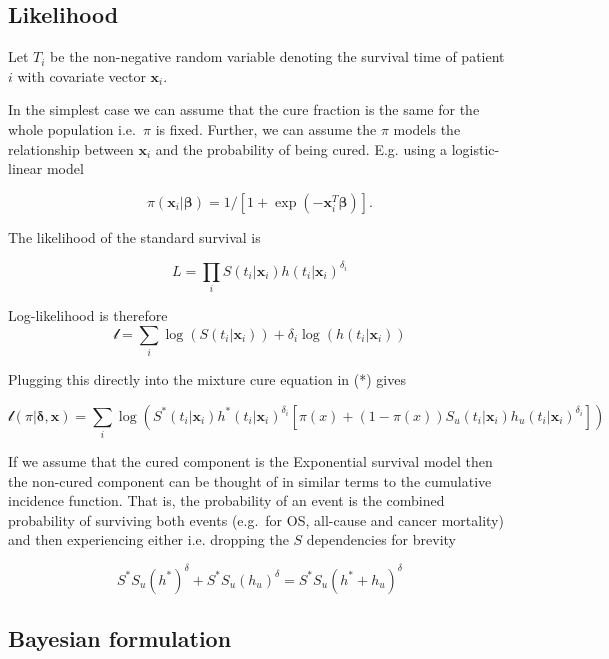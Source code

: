 \documentclass[
]{article}
\begin{document}
\hypertarget{likelihood}{%
\subsection{Likelihood}\label{likelihood}}

Let \(T_i\) be the non-negative random variable denoting the survival
time of patient \(i\) with covariate vector \(\boldsymbol{x}_i\).

In the simplest case we can assume that the cure fraction is the same
for the whole population i.e.~\(\pi\) is fixed. Further, we can assume
the \(\pi\) models the relationship between \(\boldsymbol{x}_i\) and the
probability of being cured. E.g. using a logistic-linear model

\[
\pi(\boldsymbol{x}_i | \boldsymbol{\beta}) = 1/[1 + \exp(-\boldsymbol{x}_i^T \boldsymbol{\beta})].
\]

The likelihood of the standard survival is

\[
L = \prod_i S(t_i | \boldsymbol{x}_i) h(t_i | \boldsymbol{x}_i)^{\delta_i}
\]

Log-likelihood is therefore \[
\mathcal{l} = \sum_i \log(S(t_i | \boldsymbol{x}_i)) + \delta_i \log(h(t_i | \boldsymbol{x}_i))
\]

Plugging this directly into the mixture cure equation in (*) gives

\[
\mathcal{l}(\pi | \boldsymbol{\delta}, \boldsymbol{x}) =
 \sum_i \log(S^*(t_i | \boldsymbol{x}_i) h^*(t_i | \boldsymbol{x}_i)^{\delta_i}[\pi(x) +
   (1 − \pi(x)) S_u(t_i | \boldsymbol{x}_i) h_u(t_i | \boldsymbol{x}_i)^{\delta_i}])
\]

If we assume that the cured component is the Exponential survival model
then the non-cured component can be thought of in similar terms to the
cumulative incidence function. That is, the probability of an event is
the combined probability of surviving both events (e.g.~for OS,
all-cause and cancer mortality) and then experiencing either i.e.
dropping the \(S\) dependencies for brevity

\begin{equation}
\tag{**}
S^* S_u (h^*)^{\delta} + S^* S_u (h_u)^{\delta} = S^* S_u (h^* + h_u)^{\delta}
\end{equation}

\hypertarget{bayesian-formulation}{%
\subsection{Bayesian formulation}\label{bayesian-formulation}}
\end{document}
